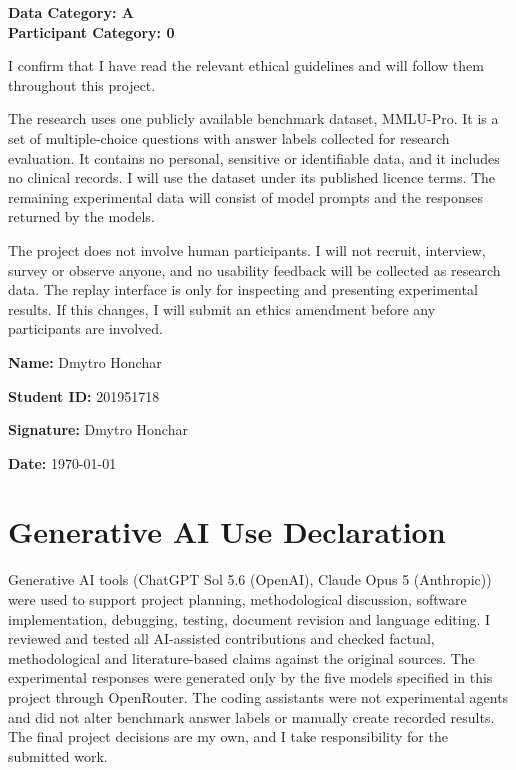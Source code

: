 \documentclass[12pt,a4paper]{article}
\begin{document}
\noindent
\textbf{Data Category: A}\\
\textbf{Participant Category: 0}

\vspace{0.5cm}

\noindent
I confirm that I have read the relevant ethical guidelines and will follow them
throughout this project.

\vspace{0.3cm}

\noindent
The research uses one publicly available benchmark dataset, MMLU-Pro. It is a
set of multiple-choice questions with answer labels collected for research
evaluation. It contains no personal, sensitive or identifiable data, and it
includes no clinical records. I will use the dataset under its published
licence terms. The remaining experimental data will consist of model prompts
and the responses returned by the models.

\vspace{0.3cm}

\noindent
The project does not involve human participants. I will not recruit, interview,
survey or observe anyone, and no usability feedback will be collected as
research data. The replay interface is only for inspecting and presenting
experimental results. If this changes, I will submit an ethics amendment before
any participants are involved.

\vspace{1.5cm}

\noindent
\textbf{Name:} Dmytro Honchar

\vspace{0.5cm}

\noindent
\textbf{Student ID:} 201951718

\vspace{0.5cm}

\noindent
\textbf{Signature:} Dmytro Honchar

\vspace{0.5cm}

\noindent
\textbf{Date:} \today


\section*{Generative AI Use Declaration}


Generative AI tools (ChatGPT Sol 5.6 (OpenAI), Claude Opus 5 (Anthropic)) were used to support project planning,
methodological discussion, software implementation, debugging, testing,
document revision and language editing. I reviewed and tested all
AI-assisted contributions and checked factual, methodological and
literature-based claims against the original sources. The experimental
responses were generated only by the five models specified in this project
through OpenRouter. The coding assistants were not experimental agents and
did not alter benchmark answer labels or manually create recorded results.
The final project decisions are my own, and I take responsibility for the
submitted work.
\end{document}
